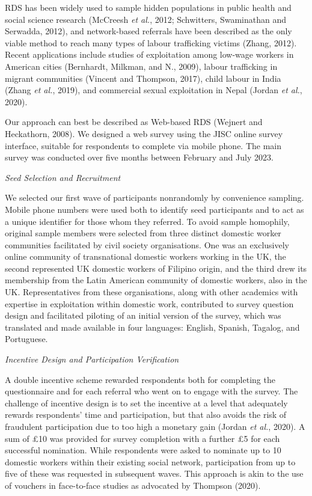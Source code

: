\documentclass[
  12pt,
  letterpaper,
  DIV=11,
  numbers=noendperiod]{scrartcl}
\begin{document}
RDS has been widely used to sample hidden populations in public health
and social science research (McCreesh \emph{et al.}, 2012; Schwitters,
Swaminathan and Serwadda, 2012), and network-based referrals have been
described as the only viable method to reach many types of labour
trafficking victims (Zhang, 2012). Recent applications include studies
of exploitation among low-wage workers in American cities (Bernhardt,
Milkman, and N., 2009), labour trafficking in migrant communities
(Vincent and Thompson, 2017), child labour in India (Zhang \emph{et
al.}, 2019), and commercial sexual exploitation in Nepal (Jordan
\emph{et al.}, 2020).

Our approach can best be described as Web-based RDS (Wejnert and
Heckathorn, 2008). We designed a web survey using the JISC online survey
interface, suitable for respondents to complete via mobile phone. The
main survey was conducted over five months between February and July
2023.

\emph{Seed Selection and Recruitment}

We selected our first wave of participants nonrandomly by convenience
sampling. Mobile phone numbers were used both to identify seed
participants and to act as a unique identifier for those whom they
referred. To avoid sample homophily, original sample members were
selected from three distinct domestic worker communities facilitated by
civil society organisations. One was an exclusively online community of
transnational domestic workers working in the UK, the second represented
UK domestic workers of Filipino origin, and the third drew its
membership from the Latin American community of domestic workers, also
in the UK. Representatives from these organisations, along with other
academics with expertise in exploitation within domestic work,
contributed to survey question design and facilitated piloting of an
initial version of the survey, which was translated and made available
in four languages: English, Spanish, Tagalog, and Portuguese.

\emph{Incentive Design and Participation Verification}

A double incentive scheme rewarded respondents both for completing the
questionnaire and for each referral who went on to engage with the
survey. The challenge of incentive design is to set the incentive at a
level that adequately rewards respondents' time and participation, but
that also avoids the risk of fraudulent participation due to too high a
monetary gain (Jordan \emph{et al.}, 2020). A sum of £10 was provided
for survey completion with a further £5 for each successful nomination.
While respondents were asked to nominate up to 10 domestic workers
within their existing social network, participation from up to five of
these was requested in subsequent waves. This approach is akin to the
use of vouchers in face-to-face studies as advocated by Thompson (2020).
\end{document}
